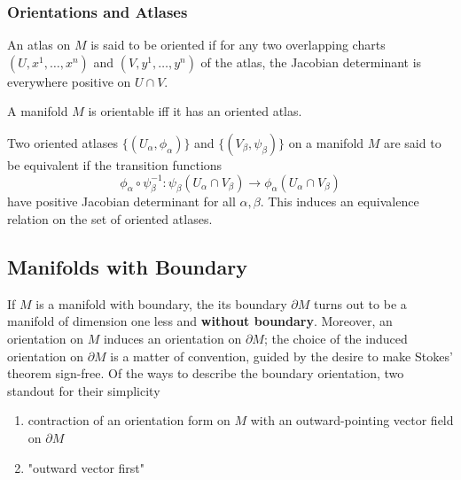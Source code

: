 \subsubsection{Orientations and Atlases}

\begin{definition}{}{}
    An atlas on \(M\) is said to be oriented if for any two overlapping charts \((U, x^1, \dots, x^n)\) and \((V, y^1, \dots, y^n)\) of the atlas, the Jacobian determinant is everywhere positive on \(U \cap V\).
\end{definition}
\begin{theorem}{}{}
    A manifold \(M\) is orientable iff it has an oriented atlas.
\end{theorem}
\begin{definition}{}{}
    Two oriented atlases \(\{ (U_\alpha, \phi_\alpha) \}\) and \(\{ (V_\beta, \psi_\beta) \}\) on a manifold \(M\) are said to be equivalent if the transition functions 
    \[
        \phi_\alpha \circ \psi_\beta^{-1} \colon \psi_\beta (U_\alpha \cap V_\beta) \rightarrow \phi_\alpha (U_\alpha \cap V_\beta)
    \]
    have positive Jacobian determinant for all \(\alpha, \beta\).
    This induces an equivalence relation on the set of oriented atlases.
\end{definition}

\subsection{Manifolds with Boundary}

If \(M\) is a manifold with boundary, the its boundary \(\partial M\) turns out to be a manifold of dimension one less and \textbf{without boundary}. 
Moreover, an orientation on \(M\) induces an orientation on \(\partial M\); the choice of the induced orientation on \(\partial M\) is a matter of convention, guided by the desire to make Stokes' theorem sign-free. 
Of the ways to describe the boundary orientation, two standout for their simplicity
\begin{enumerate}
    \item contraction of an orientation form on \(M\) with an outward-pointing vector field on \(\partial M\)
    \item "outward vector first"
\end{enumerate}

